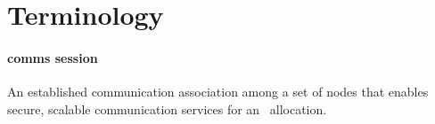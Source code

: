 \section{Terminology}

\paragraph{comms session} An established communication association among
a set of nodes that enables secure, scalable communication services for an
\ngrm\ allocation.

